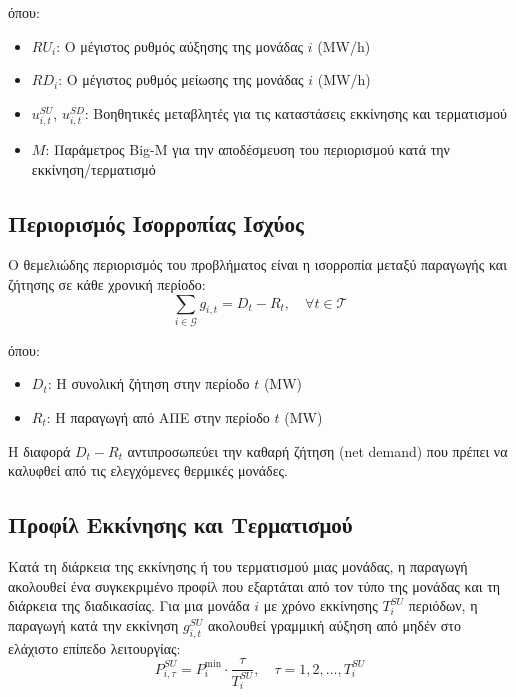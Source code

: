 όπου:
\begin{itemize}
    \item $RU_i$: Ο μέγιστος ρυθμός αύξησης της μονάδας $i$ (MW/h)
    \item $RD_i$: Ο μέγιστος ρυθμός μείωσης της μονάδας $i$ (MW/h)
    \item $u_{i,t}^{SU}$, $u_{i,t}^{SD}$: Βοηθητικές μεταβλητές για τις καταστάσεις εκκίνησης και τερματισμού
    \item $M$: Παράμετρος Big-M για την αποδέσμευση του περιορισμού κατά την εκκίνηση/τερματισμό
\end{itemize}

\subsection{Περιορισμός Ισορροπίας Ισχύος}
\label{subsec:uc-power-balance}

Ο θεμελιώδης περιορισμός του προβλήματος είναι η ισορροπία μεταξύ παραγωγής και ζήτησης σε κάθε χρονική περίοδο:
\begin{equation}
\label{eq:uc-power-balance}
\sum_{i \in \mathcal{G}} g_{i,t} = D_t - R_t, \quad \forall t \in \mathcal{T}
\end{equation}

όπου:
\begin{itemize}
    \item $D_t$: Η συνολική ζήτηση στην περίοδο $t$ (MW)
    \item $R_t$: Η παραγωγή από ΑΠΕ στην περίοδο $t$ (MW)
\end{itemize}

Η διαφορά $D_t - R_t$ αντιπροσωπεύει την καθαρή ζήτηση (net demand) που πρέπει να καλυφθεί από τις ελεγχόμενες θερμικές μονάδες.

\subsection{Προφίλ Εκκίνησης και Τερματισμού}
\label{subsec:uc-startup-shutdown-profiles}

Κατά τη διάρκεια της εκκίνησης ή του τερματισμού μιας μονάδας, η παραγωγή ακολουθεί ένα συγκεκριμένο προφίλ που εξαρτάται από τον τύπο της μονάδας και τη διάρκεια της διαδικασίας. Για μια μονάδα $i$ με χρόνο εκκίνησης $T_i^{SU}$ περιόδων, η παραγωγή κατά την εκκίνηση $g_{i,t}^{SU}$ ακολουθεί γραμμική αύξηση από μηδέν στο ελάχιστο επίπεδο λειτουργίας:
\begin{equation}
\label{eq:uc-startup-profile}
P_{i,\tau}^{SU} = P_i^{\min} \cdot \frac{\tau}{T_i^{SU}}, \quad \tau = 1, 2, \ldots, T_i^{SU}
\end{equation}

